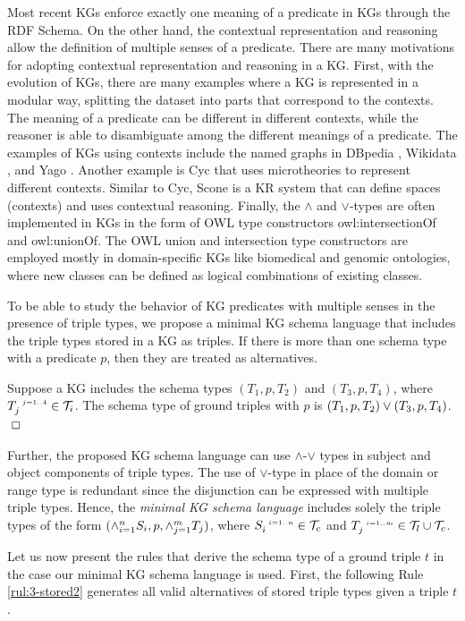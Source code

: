 \documentclass[runningheads]{llncs}
\newcommand{\s}{\scriptscriptstyle\ \,}
\newcommand{\TT}{{\cal T}}
\newcommand{\finbox}{\phantom{.}\hfill\Box}
\begin{document}
Most recent KGs enforce exactly one meaning of a predicate in KGs
through the RDF Schema. On the other hand, the contextual
representation and reasoning allow the definition of multiple senses
of a predicate. There are many motivations for adopting contextual
representation and reasoning in a KG. First, with the evolution of
KGs, there are many examples where a KG is represented in a modular
way, splitting the dataset into parts that correspond to the
contexts. The meaning of a predicate can be different in different
contexts, while the reasoner is able to disambiguate among the
different meanings of a predicate.  The examples of KGs using contexts
include the named graphs in DBpedia \cite{Auer2007}, Wikidata
\cite{vrandecic2014}, and Yago \cite{Hoffart2013}. Another example is
Cyc \cite{cyc} that uses microtheories to represent different
contexts. Similar to Cyc, Scone \cite{Fahlman2011} is a KR system that
can define spaces (contexts) and uses contextual reasoning. Finally,
the $\land$ and $\lor$-types are often implemented in KGs in the form
of OWL type constructors owl:intersectionOf and owl:unionOf. The OWL
union and intersection type constructors are employed mostly in
domain-specific KGs like biomedical and genomic ontologies, where new
classes can be defined as logical combinations of existing classes.

To be able to study the behavior of KG predicates with multiple senses
in the presence of triple types, we propose a minimal KG schema
language that includes the triple types stored in a KG as triples. If
there is more than one schema type with a predicate $p$, then they are
treated as alternatives.

\begin{example}
  Suppose a KG includes the schema types $(T_1,p,T_2)$ and
  $(T_3,p,T_4)$, where $T_j^{\s\/j=1..4}\in\TT_i$. The schema type of
  ground triples with  $p$ is
  $(T_1,p,T_2)\lor\/(T_3,p,T_4)$. $\finbox$
\end{example}

Further, the proposed KG schema language can use $\land$-$\lor$ types
in subject and object components of triple types. The use of
$\lor$-type in place of the domain or range type is redundant since
the disjunction can be expressed with multiple triple types. Hence,
the \emph{minimal KG schema language} includes solely the triple types
of the form $(\land_{i=1}^n\/S_i,p,\land_{j=1}^m\/T_j)$, where
$S_i^{\s\/i=1..n}\in\TT_c$ and $T_j^{\s\/i=1..m}\in\TT_l\cup\TT_c$.

Let us now present the rules that derive the schema type of a ground
triple $t$ in the case our minimal KG schema language is used. First,
the following Rule \ref{rul:3-stored2} generates all valid
alternatives of stored triple types given a triple $t$. 
\end{document}
